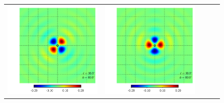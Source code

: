 \documentclass[a4paper,11pt]{article}
\begin{document}
\begin{figure}[t]
\begin{center}
\begin{tabular}{m{8ex}m{}m{}|m{}m{}}
\hspace{\kernelfigspace}\includegraphics[width=\kernelfigwidth]{qu2eb_iker_rad_lat80_lon30.pdf} &
\hspace{\kernelfigspace}\includegraphics[width=\kernelfigwidth]{qu2eb_rker_con_lat80_lon30.pdf} &

\end{tabular}
\end{center}
\end{figure}
\end{document}
